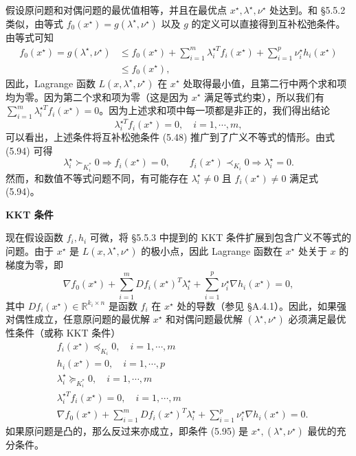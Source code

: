 \documentclass[UTF8,12pt,a4paper,fontset=fandol]{ctexart}
\begin{document}
假设原问题和对偶问题的最优值相等，并且在最优点 $x^\star,\lambda^\star,\nu^\star$ 处达到。和 §5.5.2 类似，由等式 $f_0(x^\star)=g(\lambda^\star,\nu^\star)$ 以及 $g$ 的定义可以直接得到互补松弛条件。由等式可知
\[
\begin{aligned}
f_0(x^\star)=g(\lambda^\star,\nu^\star)
&\leq f_0(x^\star)+\sum_{i=1}^m\lambda_i^{\star T}f_i(x^\star)+\sum_{i=1}^p\nu_i^\star h_i(x^\star)\\
&\leq f_0(x^\star),
\end{aligned}
\]
因此，Lagrange 函数 $L(x,\lambda^\star,\nu^\star)$ 在 $x^\star$ 处取得最小值，且第二行中两个求和项均为零。因为第二个求和项为零（这是因为 $x^\star$ 满足等式约束），所以我们有 $\sum_{i=1}^m\lambda_i^{\star T}f_i(x^\star)=0$。因为上述求和项中每一项都是非正的，我们得出结论
\begin{equation}
\lambda_i^{\star T}f_i(x^\star)=0,\quad i=1,\cdots,m,
\tag{5.94}
\end{equation}
可以看出，上述条件将互补松弛条件 (5.48) 推广到了广义不等式的情形。由式 (5.94) 可得
\[
\lambda_i^\star\succ_{K_i^\ast}0\Longrightarrow f_i(x^\star)=0,\qquad
f_i(x^\star)\prec_{K_i}0\Longrightarrow \lambda_i^\star=0.
\]
然而，和数值不等式问题不同，有可能存在 $\lambda_i^\star\neq 0$ 且 $f_i(x^\star)\neq 0$ 满足式 (5.94)。

\noindent\textbf{KKT 条件}

现在假设函数 $f_i,h_i$ 可微，将 §5.5.3 中提到的 KKT 条件扩展到包含广义不等式的问题。由于 $x^\star$ 是 $L(x,\lambda^\star,\nu^\star)$ 的极小点，因此 Lagrange 函数在 $x^\star$ 处关于 $x$ 的梯度为零，即
\[
\nabla f_0(x^\star)+\sum_{i=1}^m Df_i(x^\star)^T\lambda_i^\star+\sum_{i=1}^p\nu_i^\star\nabla h_i(x^\star)=0,
\]
其中 $Df_i(x^\star)\in\mathbb{R}^{k_i\times n}$ 是函数 $f_i$ 在 $x^\star$ 处的导数（参见 §A.4.1）。因此，如果强对偶性成立，任意原问题的最优解 $x^\star$ 和对偶问题最优解 $(\lambda^\star,\nu^\star)$ 必须满足最优性条件（或称 KKT 条件）
\begin{equation}
\begin{aligned}
& f_i(x^\star)\preceq_{K_i}0,\quad i=1,\cdots,m\\
& h_i(x^\star)=0,\quad i=1,\cdots,p\\
& \lambda_i^\star\succeq_{K_i^\ast}0,\quad i=1,\cdots,m\\
& \lambda_i^{\star T}f_i(x^\star)=0,\quad i=1,\cdots,m\\
& \nabla f_0(x^\star)+\sum_{i=1}^m Df_i(x^\star)^T\lambda_i^\star+\sum_{i=1}^p\nu_i^\star\nabla h_i(x^\star)=0.
\end{aligned}
\tag{5.95}
\end{equation}
如果原问题是凸的，那么反过来亦成立，即条件 (5.95) 是 $x^\star,(\lambda^\star,\nu^\star)$ 最优的充分条件。
\end{document}

